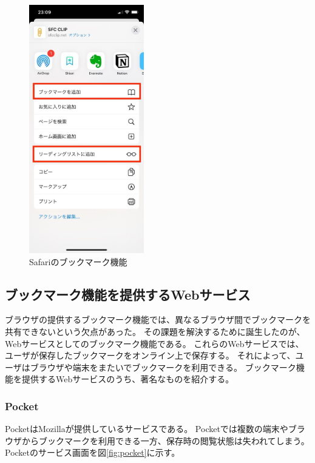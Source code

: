 \begin{figure}[htbp]
  \caption{Safariのブックマーク機能}
  \label{fig:safari-bookmark}
  \begin{center}
    \includegraphics[bb=0 0 585 1266,width=5cm]{img/020_related_works/safari-bookmark.pdf}
  \end{center}
\end{figure}

\subsection{ブックマーク機能を提供するWebサービス}
ブラウザの提供するブックマーク機能では、異なるブラウザ間でブックマークを共有できないという欠点があった。
その課題を解決するために誕生したのが、Webサービスとしてのブックマーク機能である。
これらのWebサービスでは、ユーザが保存したブックマークをオンライン上で保存する。
それによって、ユーザはブラウザや端末をまたいでブックマークを利用できる。
ブックマーク機能を提供するWebサービスのうち、著名なものを紹介する。

\subsubsection{Pocket}
PocketはMozilla\cite{mozilla}が提供しているサービスである。
Pocketでは複数の端末やブラウザからブックマークを利用できる一方、保存時の閲覧状態は失われてしまう。
Pocketのサービス画面を図\ref{fig:pocket}に示す。

